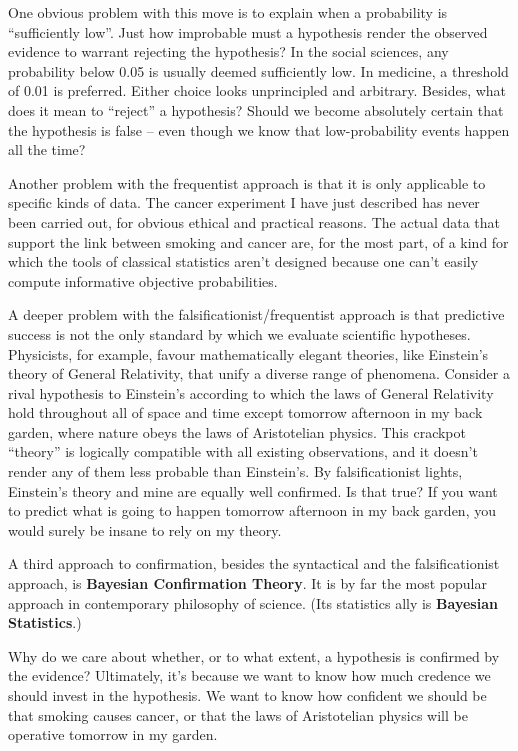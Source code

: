 One obvious problem with this move is to explain when a probability is
``sufficiently low''. Just how improbable must a hypothesis render the observed
evidence to warrant rejecting the hypothesis? In the social sciences, any
probability below 0.05 is usually deemed sufficiently low. In medicine, a
threshold of 0.01 is preferred. Either choice looks unprincipled and arbitrary.
Besides, what does it mean to ``reject'' a hypothesis? Should we become
absolutely certain that the hypothesis is false -- even though we know that
low-probability events happen all the time?

Another problem with the frequentist approach is that it is only applicable to
specific kinds of data. The cancer experiment I have just described has never
been carried out, for obvious ethical and practical reasons. The actual data
that support the link between smoking and cancer are, for the most part, of a
kind for which the tools of classical statistics aren't designed because one
can't easily compute informative objective probabilities.

A deeper problem with the falsificationist/frequentist approach is that
predictive success is not the only standard by which we evaluate scientific
hypotheses.
Physicists, for example, favour mathematically elegant theories, like
Einstein's theory of General Relativity, that unify a diverse range of phenomena.
Consider a rival hypothesis to Einstein's according to which the laws of General
Relativity hold throughout all of space and time except tomorrow afternoon in my
back garden, where nature obeys the laws of Aristotelian physics. This crackpot
``theory'' is logically compatible with all existing observations, and it
doesn't render any of them less probable than Einstein's. By falsificationist
lights, Einstein's theory and mine are equally well confirmed. Is that true?
If you want to predict what is going to happen tomorrow afternoon in my back
garden, you would surely be insane to rely on my theory.

A third approach to confirmation, besides the syntactical and the
falsificationist approach, is \textbf{Bayesian Confirmation Theory}. It is by
far the most popular approach in contemporary philosophy of science. (Its
statistics ally is \textbf{Bayesian Statistics}.)

Why do we care about whether, or to what extent, a hypothesis is
confirmed by the evidence? Ultimately, it's because we want to know how much
credence we should invest in the hypothesis. We want to know how confident we
should be that smoking causes cancer, or that the laws of Aristotelian physics
will be operative tomorrow in my garden.

